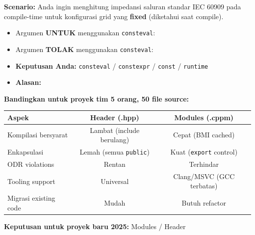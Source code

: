 \documentclass[12pt,a4paper]{article}
\begin{document}
\begin{tcolorbox}[colback=UBgreen!5, colframe=UBgreen, title=\textbf{D1. Evaluasi Desain: consteval untuk Power Flow (C5: Evaluate)}]
\textbf{Scenario:} Anda ingin menghitung impedansi saluran standar IEC 60909 pada compile-time untuk konfigurasi grid yang \textbf{fixed} (diketahui saat compile).

\begin{itemize}
  \item Argumen \textbf{UNTUK} menggunakan \texttt{consteval}:
  
  \vspace{2cm}
  
  \item Argumen \textbf{TOLAK} menggunakan \texttt{consteval}:
  
  \vspace{2cm}
  
  \item \textbf{Keputusan Anda:} \hspace{2cm} \texttt{consteval} / \texttt{constexpr} / \texttt{const} / \texttt{runtime}
  \item \textbf{Alasan:}
  
  \vspace{2cm}
\end{itemize}
\end{tcolorbox}

\vspace{0.5cm}

\begin{tcolorbox}[colback=UBgreen!5, colframe=UBgreen, title=\textbf{D2. Evaluasi: C++20 Modules vs Header (C5: Evaluate)}]
\textbf{Bandingkan untuk proyek tim 5 orang, 50 file source:}

\begin{center}
\begin{tabular}{|l|c|c|}
\hline
\textbf{Aspek} & \textbf{Header (.hpp)} & \textbf{Modules (.cppm)} \\
\hline
Kompilasi bersyarat & Lambat (include berulang) & Cepat (BMI cached) \\
\hline
Enkapsulasi & Lemah (semua \texttt{public}) & Kuat (\texttt{export} control) \\
\hline
ODR violations & Rentan & Terhindar \\
\hline
Tooling support & Universal & Clang/MSVC (GCC terbatas) \\
\hline
Migrasi existing code & Mudah & Butuh refactor \\
\hline
\end{tabular}
\end{center}

\textbf{Keputusan untuk proyek baru 2025:} \hspace{3cm} Modules / Header
\end{tcolorbox}
\end{document}
